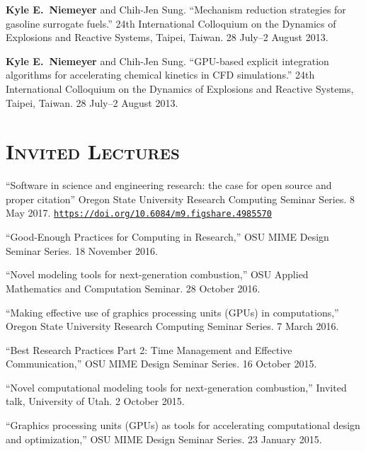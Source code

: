 \documentclass[margin,line,11pt]{res}
\makeatletter
\newlength{\bibhang}
\newlength{\bibsep}
 {\@listi \global\bibsep\itemsep \global\advance\bibsep by\parsep}
\newenvironment{bibenum*}
  {\renewcommand\labelenumi{\theenumi.}%
   \etaremune[
     topsep=0pt,
     itemsep=\bibsep,
     parsep=0pt,partopsep=0pt,
     itemindent=-\bibhang,
     leftmargin={\bibhang+\widthof{[999]}}]}
  {\endetaremune}
\newcommand*{\doi}[1]{\href{https://doi.org/#1}{\nolinkurl{https://doi.org/#1}}}
\makeatother
\begin{document}
\begin{resume}
\begin{bibenum*}
\item \textbf{Kyle E.~Niemeyer} and Chih-Jen Sung.
``Mechanism reduction strategies for gasoline surrogate fuels.''
24th International Colloquium on the Dynamics of Explosions and Reactive Systems, Taipei, Taiwan.
28 July--2 August 2013.

\item \textbf{Kyle E.~Niemeyer} and Chih-Jen Sung.
``GPU-based explicit integration algorithms for accelerating chemical kinetics in CFD simulations.''
24th International Colloquium on the Dynamics of Explosions and Reactive Systems, Taipei, Taiwan.
28 July--2 August 2013.

\end{bibenum*}

\section{\textsc{Invited Lectures}}

\begin{bibenum*}
\item ``Software in science and engineering research: the case for open source and proper citation''
Oregon State University Research Computing Seminar Series. 8 May 2017.
\doi{10.6084/m9.figshare.4985570}

\item ``Good-Enough Practices for Computing in Research,''
OSU MIME Design Seminar Series. 18 November 2016.

\item ``Novel modeling tools for next-generation combustion,''
OSU Applied Mathematics and Computation Seminar. 28 October 2016.

\item ``Making effective use of graphics processing units (GPUs) in computations,''
Oregon State University Research Computing Seminar Series. 7 March 2016.

\item ``Best Research Practices Part 2: Time Management and Effective Communication,''
OSU MIME Design Seminar Series. 16 October 2015.

\item ``Novel computational modeling tools for next-generation combustion,''
Invited talk, University of Utah. 2 October 2015.

\item ``Graphics processing units (GPUs) as tools for accelerating computational design and optimization,''
OSU MIME Design Seminar Series. 23 January 2015.


\end{bibenum*}
\end{resume}
\end{document}
